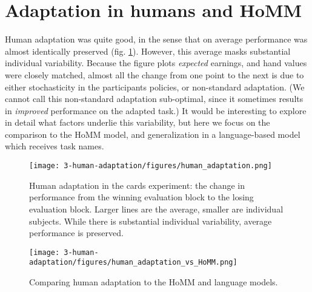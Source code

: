 \section{Adaptation in humans and HoMM}
Human adaptation was quite good, in the sense that on average performance was almost identically preserved (fig. \ref{fig:human_cards_adaptation_results}). However, this average masks substantial individual variability. Because the figure plots \emph{expected} earnings, and hand values were closely matched, almost all the change from one point to the next is due to either stochasticity in the participants policies, or non-standard adaptation. (We cannot call this non-standard adaptation sub-optimal, since it sometimes results in \emph{improved} performance on the adapted task.) It would be interesting to explore in detail what factors underlie this variability, but here we focus on the comparison to the HoMM model, and generalization in a language-based model which receives task names. \par  
\begin{figure}
\centering
\texttt{[image: 3-human-adaptation/figures/human\_adaptation.png]}
\caption{Human adaptation in the cards experiment: the change in performance from the winning evaluation block to the losing evaluation block. Larger lines are the average, smaller are individual subjects. While there is substantial individual variability, average performance is preserved.} \label{fig:human_cards_adaptation_results}
\end{figure}

\begin{figure}
\centering
\texttt{[image: 3-human-adaptation/figures/human\_adaptation\_vs\_HoMM.png]}
\caption{Comparing human adaptation to the HoMM and language models.}\label{fig:human_cards_homm_results}
\end{figure}

